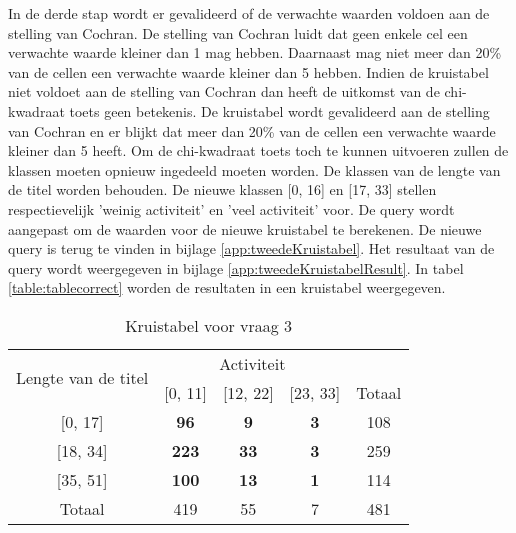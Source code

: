 In de derde stap wordt er gevalideerd of de verwachte waarden voldoen aan de stelling van Cochran. De stelling van Cochran luidt dat geen enkele cel een verwachte waarde kleiner dan 1 mag hebben. Daarnaast mag niet meer dan 20\% van de cellen een verwachte waarde kleiner dan 5 hebben. Indien de kruistabel niet voldoet aan de stelling van Cochran dan heeft de uitkomst van de chi-kwadraat toets geen betekenis. De kruistabel wordt gevalideerd aan de stelling van Cochran en er blijkt dat meer dan 20\% van de cellen een verwachte waarde kleiner dan 5 heeft. Om de chi-kwadraat toets toch te kunnen uitvoeren zullen de klassen moeten opnieuw ingedeeld moeten worden. De klassen van de lengte van de titel worden behouden. De nieuwe klassen [0, 16] en [17, 33] stellen respectievelijk 'weinig activiteit' en 'veel activiteit' voor. De query wordt aangepast om de waarden voor de nieuwe kruistabel te berekenen. De nieuwe query is terug te vinden in bijlage \ref{app:tweedeKruistabel}. Het resultaat van de query wordt weergegeven in bijlage \ref{app:tweedeKruistabelResult}. In tabel \ref{table:tablecorrect} worden de resultaten in een kruistabel weergegeven.

\begin{table}[]
	\centering
	\begin{tabular}{|c|c|c|c|c|}
		\hline
		\multirow{2}{*}{Lengte van de titel} & \multicolumn{3}{c|}{Activiteit}            & \multicolumn{1}{l|}{} \\ \cline{2-5} 
		& {[}0, 11{]}  & {[}12, 22{]} & {[}23, 33{]} & Totaal                \\ \hline
		{[}0, 17{]}                          & \textbf{96}  & \textbf{9}   & \textbf{3}   & 108                   \\ \hline
		{[}18, 34{]}                         & \textbf{223} & \textbf{33}  & \textbf{3}   & 259                   \\ \hline
		{[}35, 51{]}                         & \textbf{100} & \textbf{13}  & \textbf{1}   & 114                   \\ \hline
		Totaal                               & 419          & 55           & 7            & 481                   \\ \hline
	\end{tabular}
	\caption{Kruistabel voor vraag 3}
	\label{table:tablewrong}
\end{table}

